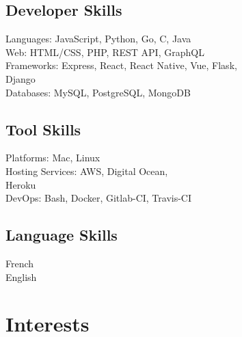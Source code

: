 \documentclass[a4paper]{deedy-resume} %
\begin{document}
\begin{minipage}[t]{0.55\textwidth}

\subsection{Developer Skills}

\textbullet{} Languages: JavaScript, Python, Go, C, Java \\
\textbullet{} Web: HTML/CSS, PHP, REST API, GraphQL \\
\textbullet{} Frameworks: Express, React, React Native, Vue, Flask, \\ Django \\
\textbullet{} Databases: MySQL, PostgreSQL, MongoDB \\

\end{minipage}
\begin{minipage}[t]{0.40\textwidth}

\subsection{Tool Skills}

\textbullet{} Platforms: Mac, Linux \\
\textbullet{} Hosting Services: AWS, Digital Ocean, \\
Heroku \\
\textbullet{} DevOps: Bash, Docker, Gitlab-CI, Travis-CI \\
\end{minipage}

\begin{minipage}[t]{0.39\textwidth}

\subsection{Language Skills}

French\\
English

\end{minipage}

\sectionspace %



\section{Interests}
\end{document}
